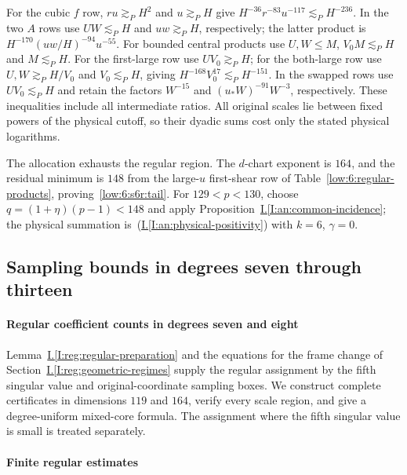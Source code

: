 \documentclass[11pt]{amsart}
\theoremstyle{definition}
\theoremstyle{remark}
\numberwithin{equation}{section}
\newcommand{\partIref}[1]{\hyperref[I:#1]{I.\ref*{I:#1}}}
\newcommand{\partIeqref}[1]{\textup{(\partIref{#1})}}
\begin{document}
For the cubic $f$ row, $ru\gtrsim_PH^2$ and $u\gtrsim_PH$ give $H^{-36}r^{-83}u^{-117}\lesssim_PH^{-236}$. In the two $A$ rows use $UW\lesssim_PH$ and $uw\gtrsim_PH$, respectively; the latter product is $H^{-170}(uw/H)^{-94}u^{-55}$. For bounded central products use $U,W\le M$, $V_0M\lesssim_PH$ and $M\lesssim_PH$. For the first-large row use $UV_0\gtrsim_PH$; for the both-large row use $U,W\gtrsim_PH/V_0$ and $V_0\lesssim_PH$, giving $H^{-168}V_0^{17}\lesssim_PH^{-151}$. In the swapped rows use $UV_0\lesssim_PH$ and retain the factors $W^{-15}$ and $(u_*W)^{-91}W^{-3}$, respectively. These inequalities include all intermediate ratios. All original scales lie between fixed powers of the physical cutoff, so their dyadic sums cost only the stated physical logarithms.

The allocation exhausts the regular region. The $d$-chart exponent is $164$, and the residual minimum is $148$ from the large-$u$ first-shear row of Table~\ref{low:6:regular-products}, proving~\eqref{low:6:s6r:tail}. For $129<p<130$, choose $q=(1+\eta)(p-1)<148$ and apply Proposition~\partIref{an:common-incidence}; the physical summation is~\partIeqref{an:physical-positivity} with $k=6$, $\gamma=0$.

\subsection{Sampling bounds in degrees seven through thirteen}\label{reg:seven-thirteen}\label{low:78:h3r:section}\label{low:9:root9:regular}\label{low:ten-thirteen}

\paragraph{Regular coefficient counts in degrees seven and eight}

Lemma~\partIref{reg:regular-preparation} and the equations for the frame change of Section~\partIref{reg:geometric-regimes} supply the regular assignment by the fifth singular value and original-coordinate sampling boxes. We construct complete certificates in dimensions $119$ and $164$, verify every scale region, and give a degree-uniform mixed-core formula. The assignment where the fifth singular value is small is treated separately.

\paragraph{Finite regular estimates}
\end{document}
